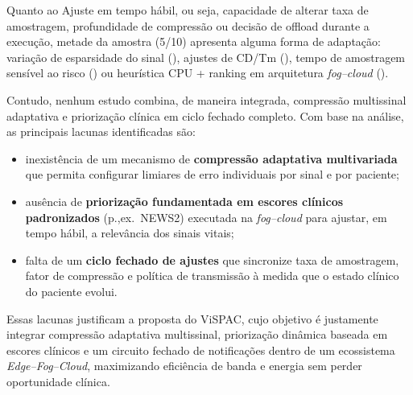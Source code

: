 \documentclass[twoside,english,brazilian]{UNISINOSmonografia}
\begin{document}
Quanto ao Ajuste em tempo hábil, ou seja, capacidade de alterar taxa de amostragem, profundidade de compressão ou decisão de offload durante a execução, metade da amostra (5/10) apresenta alguma forma de adaptação: variação de esparsidade do sinal (\cite{ESMAEILI2023}), ajustes de CD/Tm (\cite{Andrade2025}), tempo de amostragem sensível ao risco (\cite{Shankani2025,TAO2025}) ou heurística CPU + ranking em arquitetura \textit{fog–cloud} (\cite{CASSEL2024}).

Contudo, nenhum estudo combina, de maneira integrada, compressão multissinal adaptativa e priorização clínica em ciclo fechado completo. Com base na análise, as principais lacunas identificadas são:

\begin{itemize}
\item inexistência de um mecanismo de \textbf{compressão adaptativa multivariada} que permita configurar limiares de erro individuais por sinal e por paciente;
\item ausência de \textbf{priorização fundamentada em escores clínicos padronizados} (p.,ex.\ NEWS2) executada na \textit{fog–cloud} para ajustar, em tempo hábil, a relevância dos sinais vitais;
\item falta de um \textbf{ciclo fechado de ajustes} que sincronize taxa de amostragem, fator de compressão e política de transmissão à medida que o estado clínico do paciente evolui.
\end{itemize}

Essas lacunas justificam a proposta do ViSPAC, cujo objetivo é justamente integrar compressão adaptativa multissinal, priorização dinâmica baseada em escores clínicos e um circuito fechado de notificações dentro de um ecossistema \textit{Edge–Fog–Cloud}, maximizando eficiência de banda e energia sem perder oportunidade clínica.
\end{document}

